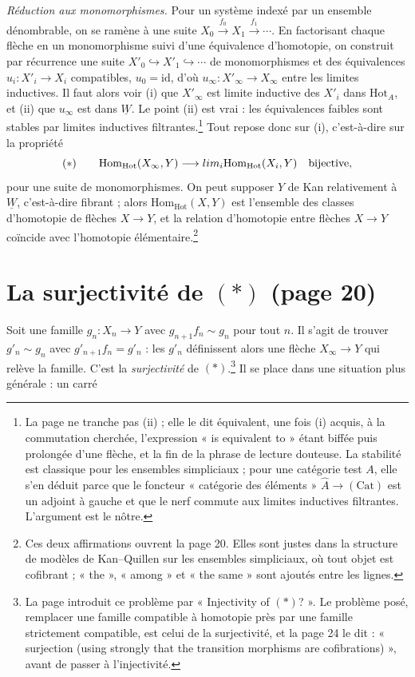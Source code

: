 \documentclass[11pt,a4paper]{article}
\begin{document}
\emph{Réduction aux monomorphismes.} Pour un système indexé par un ensemble
dénombrable, on se ramène à une suite $X_{0} \xrightarrow{f_{0}} X_{1}
\xrightarrow{f_{1}} \cdots$. En factorisant chaque flèche en un monomorphisme
suivi d'une équivalence d'homotopie, on construit par récurrence une suite
$X'_{0} \hookrightarrow X'_{1} \hookrightarrow \cdots$ de monomorphismes et des
équivalences $u_{i} : X'_{i} \to X_{i}$ compatibles, $u_{0} = \mathrm{id}$,
d'où $u_{\infty} : X'_{\infty} \to X_{\infty}$ entre les limites inductives.
Il faut alors voir (i) que $X'_{\infty}$ est limite inductive des $X'_{i}$
dans $\mathrm{Hot}_{A}$, et (ii) que $u_{\infty}$ est dans
$\underline{W}$. Le point (ii) est vrai : les équivalences faibles sont
stables par limites inductives filtrantes.\footnote{La page ne tranche pas
(ii) ; elle le dit équivalent, une fois (i) acquis, à la commutation
cherchée, l'expression « is equivalent to » étant biffée puis prolongée d'une
flèche, et la fin de la phrase de lecture douteuse. La stabilité est
classique pour les ensembles simpliciaux ; pour une catégorie test $A$, elle
s'en déduit parce que le foncteur « catégorie des éléments » $\widehat{A}
\to (\mathrm{Cat})$ est un adjoint à gauche et que le nerf commute aux limites
inductives filtrantes. L'argument est le nôtre.} Tout repose donc sur (i),
c'est-à-dire sur la propriété
\[
(*) \qquad \mathrm{Hom}_{\mathrm{Hot}}(X_{\infty}, Y) \longrightarrow
\varprojlim_{i} \mathrm{Hom}_{\mathrm{Hot}}(X_{i}, Y)
\quad \text{bijective,}
\]
pour une suite de monomorphismes. On peut supposer $Y$ de Kan relativement à
$\underline{W}$, c'est-à-dire fibrant ; alors $\mathrm{Hom}_{\mathrm{Hot}}(X,
Y)$ est l'ensemble des classes d'homotopie de flèches $X \to Y$, et la
relation d'homotopie entre flèches $X \to Y$ coïncide avec l'homotopie
élémentaire.\footnote{Ces deux affirmations ouvrent la page 20. Elles sont
justes dans la structure de modèles de Kan--Quillen sur les ensembles
simpliciaux, où tout objet est cofibrant ; « the », « among » et « the same »
sont ajoutés entre les lignes.}

\section*{La surjectivité de $(*)$ (page 20)}

Soit une famille $g_{n} : X_{n} \to Y$ avec $g_{n+1} f_{n} \sim g_{n}$ pour
tout $n$. Il s'agit de trouver $g'_{n} \sim g_{n}$ avec $g'_{n+1} f_{n} =
g'_{n}$ : les $g'_{n}$ définissent alors une flèche $X_{\infty} \to Y$ qui
relève la famille. C'est la \emph{surjectivité} de $(*)$.\footnote{La page
introduit ce problème par « Injectivity of $(*)$? ». Le problème posé,
remplacer une famille compatible à homotopie près par une famille
strictement compatible, est celui de la surjectivité, et la page 24 le
dit : « surjection (using strongly that the transition morphisms are
cofibrations) », avant de passer à l'injectivité.} Il se place dans une
situation plus générale : un carré
\end{document}
